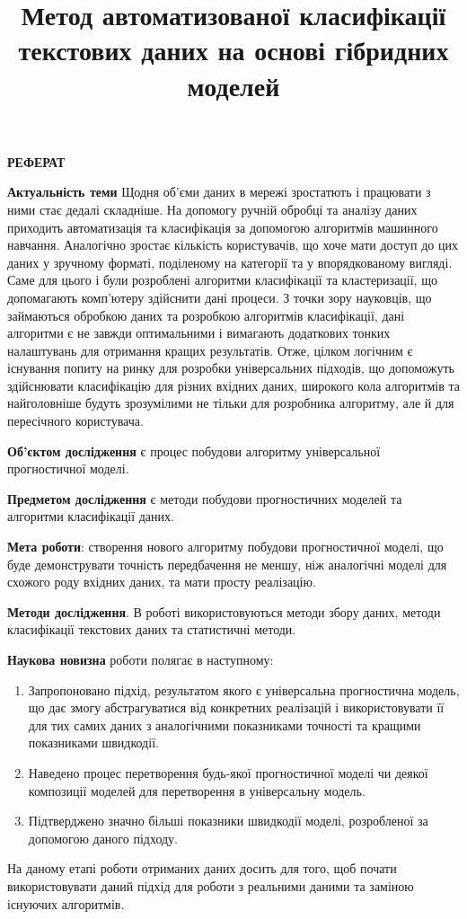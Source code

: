 \documentclass[a4paper,14pt]{extarticle}
\begin{document}
\title{Метод автоматизованої класифікації текстових даних на основі гібридних моделей}

\begin{center}
	\textbf{\uppercase{Реферат}}
\end{center}

\textbf{Актуальність теми} Щодня об'єми даних в мережі зростатють і працювати з ними стає дедалі складніше. На допомогу ручній обробці та аналізу даних приходить автоматизація та класифікація за допомогою алгоритмів машинного навчання. Аналогічно зростає кількість користувачів, що хоче мати доступ до цих даних у зручному форматі, поділеному на категорії та у впорядкованому вигляді. Саме для цього і були розроблені алгоритми класифікації та кластеризації, що допомагають комп'ютеру здійснити дані процеси. З точки зору науковців, що займаються обробкою даних та розробкою алгоритмів класифікації, дані алгоритми є не завжди оптимальними і вимагають додаткових тонких налаштувань для отримання кращих результатів. Отже, цілком логічним є існування попиту на ринку для розробки універсальних підходів, що допоможуть здійснювати класифікацію для різних вхідних даних, широкого кола алгоритмів та найголовніше будуть зрозумілими не тільки для розробника алгоритму, але й для пересічного користувача.

\textbf{Об'єктом дослідження} є процес побудови алгоритму універсальної прогностичної моделі.

\textbf{Предметом дослідження} є методи побудови прогностичних моделей та алгоритми класифікації даних.

\textbf{Мета роботи}: створення нового алгоритму побудови прогностичної моделі, що буде демонструвати точність передбачення не меншу, ніж аналогічні моделі для схожого роду вхідних даних, та мати просту реалізацію.

\textbf{Методи дослідження}. В роботі використовуються методи збору даних, методи класифікації текстових даних та статистичні методи.

\textbf{Наукова новизна} роботи полягає в наступному:

\begin{enumerate}
	\item Запропоновано підхід, результатом якого є універсальна прогностична модель, що дає змогу абстрагуватися від конкретних реалізацій і використовувати її для тих самих даних з аналогічними показниками точності та кращими показниками швидкодії.
	\item Наведено процес перетворення будь-якої прогностичної моделі чи деякої композиції моделей для перетворення в універсальну модель.
	\item Підтверджено значно більші показники швидкодії моделі, розробленої за допомогою даного підходу.
\end{enumerate}
На даному етапі роботи отриманих даних досить для того, щоб почати використовувати даний підхід для роботи з реальними даними та заміною існуючих алгоритмів.
\end{document}

